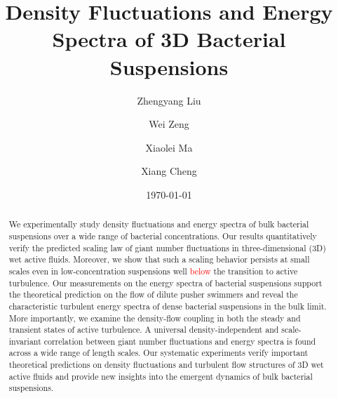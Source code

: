 \documentclass[twocolumn,aps,prx,amsmath,amssymb,longbibliography,superscriptaddress]{revtex4-2}
\begin{document}
\title{Density Fluctuations and Energy Spectra of 3D Bacterial Suspensions}




\author{Zhengyang Liu}
\author{Wei Zeng}
\author{Xiaolei Ma}
\author{Xiang Cheng}




\date{\today}


\begin{abstract}
We experimentally study density fluctuations and energy spectra of bulk bacterial suspensions over a wide range of bacterial concentrations. Our results quantitatively verify the predicted scaling law of giant number fluctuations in three-dimensional (3D) wet active fluids. Moreover, we show that such a scaling behavior persists at small scales even in low-concentration suspensions well \textcolor{red}{below} the transition to active turbulence. Our measurements on the energy spectra of bacterial suspensions support the theoretical prediction on the flow of dilute pusher swimmers and reveal the characteristic turbulent energy spectra of dense bacterial suspensions in the bulk limit. More importantly, we examine the density-flow coupling in both the steady and transient states of active turbulence. A universal density-independent and scale-invariant correlation between giant number fluctuations and energy spectra is found across a wide range of length scales. Our systematic experiments verify important theoretical predictions on density fluctuations and turbulent flow structures of 3D wet active fluids and provide new insights into the emergent dynamics of bulk bacterial suspensions.

\end{abstract}

\maketitle
\end{document}
